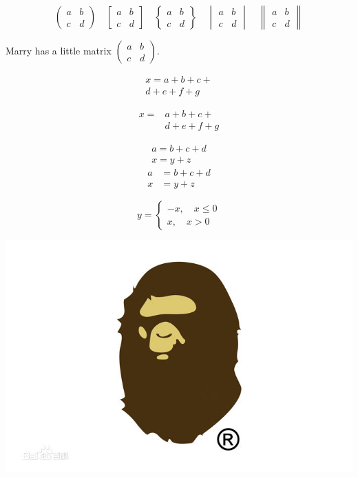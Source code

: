 \documentclass[UTF8]{article}
\begin{document}
\[ \begin{pmatrix} a&b\\c&d \end{pmatrix} \quad
\begin{bmatrix} a&b\\c&d \end{bmatrix} \quad
\begin{Bmatrix} a&b\\c&d \end{Bmatrix} \quad
\begin{vmatrix} a&b\\c&d \end{vmatrix} \quad
\begin{Vmatrix} a&b\\c&d \end{Vmatrix} \]

Marry has a little matrix $ ( \begin{smallmatrix} a&b\\c&d \end{smallmatrix} ) $.

\begin{multline}
x = a+b+c+{} \\
d+e+f+g
\end{multline}

\[\begin{aligned}
x ={}& a+b+c+{} \\
&d+e+f+g
\end{aligned}\]

\begin{gather}
a = b+c+d \\
x = y+z
\end{gather}
\begin{align}
a &= b+c+d \\
x &= y+z
\end{align}

\[ y= \begin{cases}
-x,\quad x\leq 0 \\
x,\quad x>0
\end{cases} \]

\includegraphics[width = .8\textwidth]{a.jpg}
\end{document}
